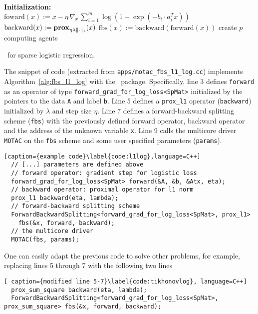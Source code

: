 \begin{algorithm}[H]\label{alg:fbs_l1_log}
\DontPrintSemicolon
  \textbf{Initialization:} \\
  \quad $\text{foward}(x) := x - \eta \, \nabla_x \,\sum_{i = 1}^m \log (1 + \exp(-b_i \cdot a_i^T x))$  
  \quad $\text{backward}(x) := \mathbf{prox}_{\eta \lambda  \|\cdot\|_1} (x)$ 
  \quad $\text{fbs}(x) := \text{backward}(\text{forward}(x))$ 
  \quad create $p$ computing agents \\
  \caption{\pkg~for sparse logistic regression.}
\end{algorithm}
The snippet of code (extracted from
\texttt{apps/motac\_fbs\_l1\_log.cc}) implements Algorithm~\ref{alg:fbs_l1_log} with the \pkg~package.
Specifically, line 3 defines \texttt{forward} as an operator of type \texttt{forward\_grad\_for\_log\_loss<SpMat>}
initialized by the pointers to the data \texttt{A} and label \texttt{b}. Line 5  defines a
\texttt{prox\_l1} operator (\texttt{backward}) initialized by $\lambda$ and step size $\eta$.
Line 7 defines a forward-backward splitting scheme (\texttt{fbs}) with the previously defined forward operator,
backward operator and the address of the unknown variable \texttt{x}. Line 9 calls the multicore driver
\texttt{MOTAC} on the \texttt{fbs} scheme and some user specified parameters (\texttt{params}).
\begin{lstlisting}[caption={example code}\label{code:l1log},language=C++]
  // [...] parameters are defined above
  // forward operator: gradient step for logistic loss
  forward_grad_for_log_loss<SpMat> forward(&A, &b, &Atx, eta);
  // backward operator: proximal operator for l1 norm
  prox_l1 backward(eta, lambda);
  // forward-backward splitting scheme
  ForwardBackwardSplitting<forward_grad_for_log_loss<SpMat>, prox_l1>
    fbs(&x, forward, backward);
  // the multicore driver
  MOTAC(fbs, params);
\end{lstlisting}
One can easily adapt the previous code to solve other problems, for example, replacing lines 5 through 7 with
the following two lines
\begin{lstlisting}[ caption={modified line 5-7}\label{code:tikhonovlog}, language=C++]
  prox_sum_square backward(eta, lambda);
  ForwardBackwardSplitting<forward_grad_for_log_loss<SpMat>, prox_sum_square> fbs(&x, forward, backward);
\end{lstlisting}
